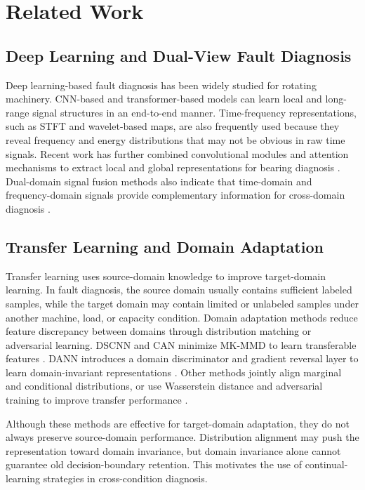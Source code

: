 \documentclass[conference,letterpaper]{IEEEtran}\IEEEoverridecommandlockouts
\begin{document}
\section{Related Work}
\subsection{Deep Learning and Dual-View Fault Diagnosis}
Deep learning-based fault diagnosis has been widely studied for rotating machinery. CNN-based and transformer-based models can learn local and long-range signal structures in an end-to-end manner. Time-frequency representations, such as STFT and wavelet-based maps, are also frequently used because they reveal frequency and energy distributions that may not be obvious in raw time signals. Recent work has further combined convolutional modules and attention mechanisms to extract local and global representations for bearing diagnosis \cite{yu2023adaptive}. Dual-domain signal fusion methods also indicate that time-domain and frequency-domain signals provide complementary information for cross-domain diagnosis \cite{xing2023dsfan}.

\subsection{Transfer Learning and Domain Adaptation}
Transfer learning uses source-domain knowledge to improve target-domain learning. In fault diagnosis, the source domain usually contains sufficient labeled samples, while the target domain may contain limited or unlabeled samples under another machine, load, or capacity condition. Domain adaptation methods reduce feature discrepancy between domains through distribution matching or adversarial learning. DSCNN and CAN minimize MK-MMD to learn transferable features \cite{gretton2012mmd,cao2021dscnn,yang2018can}. DANN introduces a domain discriminator and gradient reversal layer to learn domain-invariant representations \cite{ganin2016dann}. Other methods jointly align marginal and conditional distributions, or use Wasserstein distance and adversarial training to improve transfer performance \cite{long2017jan,xiao2022njtn,yu2023adaptive}.

Although these methods are effective for target-domain adaptation, they do not always preserve source-domain performance. Distribution alignment may push the representation toward domain invariance, but domain invariance alone cannot guarantee old decision-boundary retention. This motivates the use of continual-learning strategies in cross-condition diagnosis.
\end{document}
